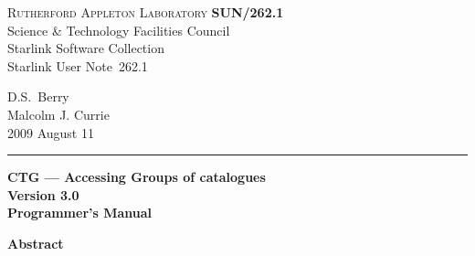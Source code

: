 \documentclass[twoside,11pt]{article}
\newcommand{\stardoccategory}  {Starlink User Note}
\newcommand{\stardocinitials}  {SUN}
\newcommand{\stardocnumber}    {262.1}
\newcommand{\stardocauthors}   {D.S.\ Berry \\ Malcolm J. Currie}
\newcommand{\stardocdate}      {2009 August 11}
\newcommand{\stardoctitle}     {CTG --- Accessing Groups of catalogues}
\newcommand{\stardocversion}   {Version 3.0}
\newcommand{\stardocmanual}    {Programmer's Manual}
\newcommand{\stardocname}{\stardocinitials /\stardocnumber}
\newenvironment{latexonly}{}{}
\renewcommand{\_}{\texttt{\symbol{95}}}
\begin{document}
\thispagestyle{empty}

\begin{latexonly}
   \textsc{Rutherford Appleton Laboratory} \hfill \textbf{\stardocname}\\
   {\large Science \& Technology Facilities Council}\\
   {\large Starlink Software Collection\\}
   {\large \stardoccategory\ \stardocnumber}
   \begin{flushright}
   \stardocauthors\\
   \stardocdate
   \end{flushright}
   \vspace{-4mm}
   \rule{\textwidth}{0.5mm}
   \vspace{5mm}
   \begin{center}
   {\Huge\textbf{\stardoctitle \\ [2.5ex]}}
   {\LARGE\textbf{\stardocversion \\ [4ex]}}
   {\Huge\textbf{\stardocmanual}}
   \end{center}
   \vspace{5mm}


   \vspace{10mm}
   \begin{center}
      {\Large\textbf{Abstract}}
   \end{center}
\end{latexonly}
\end{document}
